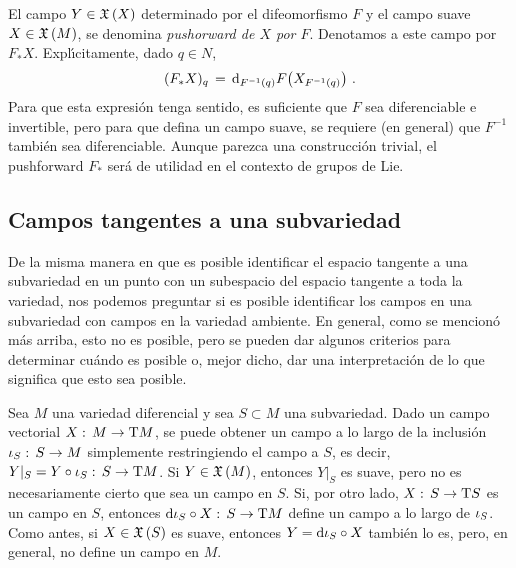El campo $Y\in\champs{X}$ determinado por el difeomorfismo $F$ y el
campo suave $X\in\champs{M}$, se denomina \emph{pushorward de $X$ por $F$}.
Denotamos a este campo por $F_{*}X$. Expl\'{\i}citamente, dado $q\in N$,
\begin{equation}
	\label{eq:pushforwarddifeo}
	(F_{*}X)_{q} \,=\,\diferencial[F^{-1}(q)]{F}\big(X_{F^{-1}(q)}\big)
	\text{ .}
\end{equation}
%
Para que esta expresi\'{o}n tenga sentido, es suficiente que $F$ sea
diferenciable e invertible, pero para que defina un campo suave, se
requiere (en general) que $F^{-1}$ tambi\'{e}n sea diferenciable.
Aunque parezca una construcci\'{o}n trivial, el pushforward $F_{*}$
ser\'{a} de utilidad en el contexto de grupos de Lie.

\subsection{Campos tangentes a una subvariedad}
De la misma manera en que es posible identificar el espacio tangente a
una subvariedad en un punto con un subespacio del espacio tangente a toda
la variedad, nos podemos preguntar si es posible identificar los
campos en una subvariedad con campos en la variedad ambiente. En general,
como se mencion\'{o} m\'{a}s arriba, esto no es posible, pero se pueden
dar algunos criterios para determinar cu\'{a}ndo es posible o, mejor
dicho, dar una interpretaci\'{o}n de lo que significa que esto sea posible.

Sea $M$ una variedad diferencial y sea $S\subset M$ una subvariedad.
Dado un campo vectorial $X:\,M\rightarrow\tangente{M}$, se puede obtener un
campo a lo largo de la inclusi\'{o}n $\inc[S]:\,S\rightarrow M$ simplemente
restringiendo el campo a $S$, es decir,
$Y|_{S}=Y\circ\inc[S]:\,S\rightarrow\tangente{M}$. Si $Y\in\champs{M}$,
entonces $Y|_{S}$ es suave, pero no es necesariamente cierto que sea
un campo en $S$. Si, por otro lado, $X:\,S\rightarrow\tangente{S}$ es un
campo en $S$, entonces $\diferencial{\inc[S]}\circ X:\,%
S\rightarrow\tangente{M}$ define un campo a lo largo de $\inc[S]$. Como antes,
si $X\in\champs{S}$ es suave, entonces $Y=\diferencial{\inc[S]}\circ X$
tambi\'{e}n lo es, pero, en general, no define un campo en $M$.

